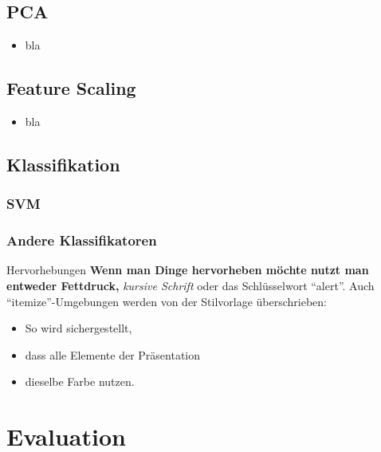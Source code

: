 \documentclass{beamer}
\begin{document}
\subsection{PCA}
\begin{frame}
  \begin{itemize}
    \item bla
  \end{itemize}
\end{frame}

\subsection{Feature Scaling}
\begin{frame}
  \begin{itemize}
    \item bla
  \end{itemize}
\end{frame}

\subsection{Klassifikation}
\subsubsection{SVM}
\subsubsection{Andere Klassifikatoren}
\begin{frame}
  \begin{block}{Hervorhebungen}
    \textbf{Wenn man Dinge hervorheben möchte nutzt man entweder Fettdruck,}
    \textit{ kursive Schrift} \alert{ oder das Schlüsselwort ``alert''}.
  Auch ``itemize''-Umgebungen werden von der Stilvorlage überschrieben:
  \end{block}
  \pause
  \begin{itemize}
    \item So wird sichergestellt,
    \item dass alle Elemente der Präsentation 
    \item dieselbe Farbe nutzen.
  \end{itemize}
\end{frame}

\section{Evaluation}
\end{document}
